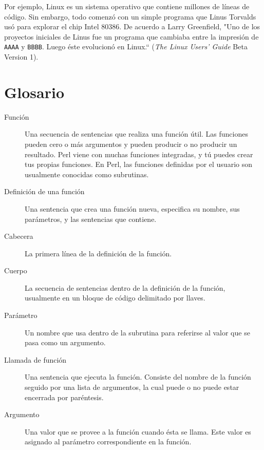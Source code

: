 Por ejemplo, Linux es un sistema operativo que contiene millones 
de líneas de código. Sin embargo, todo comenzó con un simple programa
que Linus Torvalds usó para explorar el chip Intel 80386. De acuerdo
a Larry Greenfield, "Uno de los proyectos iniciales de Linus fue un 
programa que cambiaba entre la impresión de \verb|AAAA| y \verb|BBBB|.
Luego éste evolucionó en Linux.``
({\em The Linux Users' Guide} Beta Version 1).


\section{Glosario}

\begin{description}

\item[Función] Una secuencia de sentencias que realiza 
una función útil. Las funciones pueden cero o más argumentos
y pueden producir o no producir un resultado. Perl viene con 
muchas funciones integradas, y tú puedes crear tus propias
funciones. En Perl, las funciones definidas por el usuario son
usualmente conocidas como subrutinas.

\item[Definición de una función]  Una sentencia que crea una función
nueva, especifica su nombre, sus parámetros, y las sentencias
que contiene.

\item[Cabecera] La primera línea de la definición de la 
función.

\item[Cuerpo] La secuencia de sentencias dentro de la definición
de la función, usualmente en un bloque de código delimitado por
llaves.

\item[Parámetro] Un nombre que usa dentro de la subrutina
para referirse al valor que se pasa como un argumento.

\item[Llamada de función] Una sentencia que ejecuta la función.
Consiste del nombre de la función seguido por una lista de 
argumentos, la cual puede o no puede estar encerrada por
paréntesis.

\item[Argumento] Una valor que se provee a la función cuando
ésta se llama. Este valor es asignado al parámetro 
correspondiente en la función.


\end{description}
